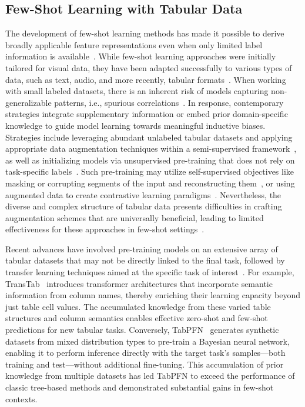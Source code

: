 \subsection{Few-Shot Learning with Tabular Data} The development of few-shot learning methods has made it possible to derive broadly applicable feature representations even when only limited label information is available~\cite{chen2018closer}. While few-shot learning approaches were initially tailored for visual data, they have been adapted successfully to various types of data, such as text, audio, and more recently, tabular formats~\cite{majumder2022few,nam2023stunt,schick2021exploiting}. When working with small labeled datasets, there is an inherent risk of models capturing non-generalizable patterns, i.e., spurious correlations~\cite{bartlett2021deep}. In response, contemporary strategies integrate supplementary information or embed prior domain-specific knowledge to guide model learning towards meaningful inductive biases. Strategies include leveraging abundant unlabeled tabular datasets and applying appropriate data augmentation techniques within a semi-supervised framework~\cite{ucar2021subtab,yoon2020vime}, as well as initializing models via unsupervised pre-training that does not rely on task-specific labels~\cite{somepalli2021saint}. Such pre-training may utilize self-supervised objectives like masking or corrupting segments of the input and reconstructing them~\cite{arik2021tabnet,majmundar2022met}, or using augmented data to create contrastive learning paradigms~\cite{bahri2022scarf,chen2020simple}. Nevertheless, the diverse and complex structure of tabular data presents difficulties in crafting augmentation schemes that are universally beneficial, leading to limited effectiveness for these approaches in few-shot settings~\cite{nam2023stunt}.

Recent advances have involved pre-training models on an extensive array of tabular datasets that may not be directly linked to the final task, followed by transfer learning techniques aimed at the specific task of interest~\cite{zhang2023generative,levin2022transfer,zhu2023xtab}. For example, TransTab~\cite{wang2022transtab} introduces transformer architectures that incorporate semantic information from column names, thereby enriching their learning capacity beyond just table cell values. The accumulated knowledge from these varied table structures and column semantics enables effective zero-shot and few-shot predictions for new tabular tasks. Conversely, TabPFN~\cite{hollmann2022tabpfn} generates synthetic datasets from mixed distribution types to pre-train a Bayesian neural network, enabling it to perform inference directly with the target task's samples—both training and test—without additional fine-tuning. This accumulation of prior knowledge from multiple datasets has led TabPFN to exceed the performance of classic tree-based methods and demonstrated substantial gains in few-shot contexts.

